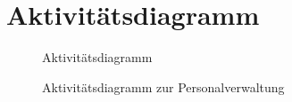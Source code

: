\section{Aktivitätsdiagramm}
\label{sec:fachkonzept-aktivitaetsdiagramm}


\begin{figure}[h]
  \centering
  \caption{Aktivitätsdiagramm}
  \label{img:fachkonzept-aktivitaetsdiagramm-uebersicht}
\end{figure}

\begin{figure}[h]
  \centering
  \caption{Aktivitätsdiagramm zur Personalverwaltung}
  \label{img:fachkonzept-aktivitaetsdiagramm-personal}
\end{figure}

